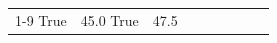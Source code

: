 \begin{table}[H]
\begin{tabular}{lllrlllll}
\cline{1-9}
True & 45.0%
\cline{1-9}
True & 47.5%

\end{tabular}
\end{table}

